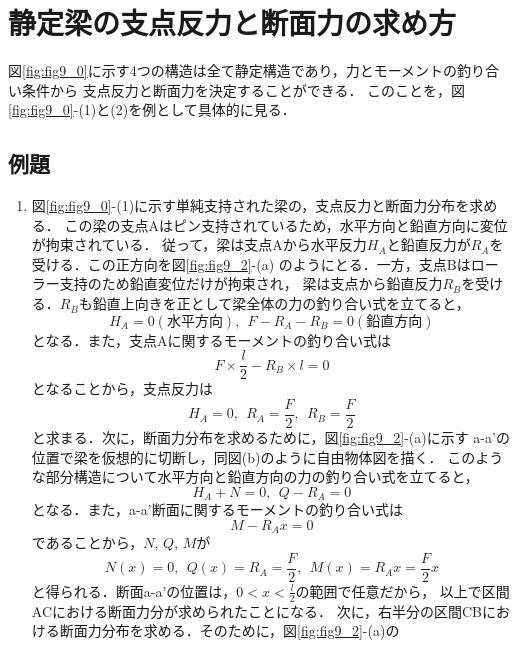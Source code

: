 \documentclass[10pt,a4j]{jbook}
\begin{document}
\section{静定梁の支点反力と断面力の求め方}
図\ref{fig:fig9_0}に示す4つの構造は全て静定構造であり，力とモーメントの釣り合い条件から
支点反力と断面力を決定することができる．
このことを，図\ref{fig:fig9_0}-(1)と(2)を例として具体的に見る．
\subsection{例題}
\begin{enumerate}
\item
図\ref{fig:fig9_0}-(1)に示す単純支持された梁の，支点反力と断面力分布を求める．
この梁の支点Aはピン支持されているため，水平方向と鉛直方向に変位が拘束されている．
従って，梁は支点Aから水平反力$H_A$と鉛直反力が$R_A$を受ける．この正方向を図\ref{fig:fig9_2}-(a)
のようにとる．一方，支点Bはローラー支持のため鉛直変位だけが拘束され，
梁は支点から鉛直反力$R_B$を受ける．$R_B$も鉛直上向きを正として梁全体の力の釣り合い式を立てると，
\begin{equation}
	H_A=0(水平方向), \ \ 
	F-R_A-R_B=0(鉛直方向)
	\label{eqn:}
\end{equation}
となる．また，支点Aに関するモーメントの釣り合い式は
\begin{equation}
	F\times \frac{l}{2}-R_B\times l =0
	\label{eqn:}
\end{equation}
となることから，支点反力は
\begin{equation}
	H_A=0, \ \ R_A=\frac{F}{2}, \ \ R_B=\frac{F}{2}
	\label{eqn:}
\end{equation}
と求まる．次に，断面力分布を求めるために，図\ref{fig:fig9_2}-(a)に示す
a-a'の位置で梁を仮想的に切断し，同図(b)のように自由物体図を描く．
このような部分構造について水平方向と鉛直方向の力の釣り合い式を立てると，
\begin{equation}
	H_A+N=0, \ \ Q-R_A=0
	\label{eqn:}
\end{equation}
となる．また，a-a'断面に関するモーメントの釣り合い式は
\begin{equation}
	M-R_A x=0
	\label{eqn:}
\end{equation}
であることから，$N,\, Q,\, M$が
\begin{equation}
	N(x)=0,\ \ Q(x)=R_A=\frac{F}{2}, \ \ 
	M(x)= R_Ax =\frac{F}{2}x
	\label{eqn:}
\end{equation}
と得られる．断面a-a'の位置は，$0< x< \frac{l}{2}$の範囲で任意だから，
以上で区間ACにおける断面力分が求められたことになる．
次に，右半分の区間CBにおける断面力分布を求める．そのために，図\ref{fig:fig9_2}-(a)の

\end{enumerate}
\end{document}
